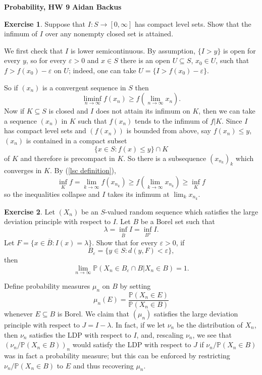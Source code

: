 \documentclass[10pt]{article}
\newcommand{\PP}{\mathbb P}
\theoremstyle{definition}
\newtheorem{exer}{Exercise}
\begin{document}
\noindent
\large\textbf{Probability, HW 9} \hfill \textbf{Aidan Backus} \\



\begin{exer}
Suppose that $I: S \to [0, \infty]$ has compact level sets. Show that the infimum of $I$ over any nonempty closed set is attained.
\end{exer}

We first check that $I$ is lower semicontinuous. By assumption, $\{I > y\}$ is open for every $y$, so for every $\varepsilon > 0$ and $x \in S$ there is an open $U \subseteq S$, $x_0 \in U$, such that $f > f(x_0) - \varepsilon$ on $U$; indeed, one can take $U = \{I > f(x_0) - \varepsilon\}$.

So if $(x_n)$ is a convergent sequence in $S$ then
\begin{equation}
\label{lsc definition}
\liminf_{n \to \infty} f(x_n) \geq f\left(\lim_{n \to \infty} x_n\right).
\end{equation}
Now if $K \subseteq S$ is closed and $I$ does not attain its infimum on $K$, then we can take a sequence $(x_n)$ in $K$ such that $f(x_n)$ tends to the infimum of $f|K$.
Since $I$ has compact level sets and $(f(x_n))$ is bounded from above, say $f(x_n) \leq y$, $(x_n)$ is contained in a compact subset
$$\{x \in S: f(x) \leq y\} \cap K$$
of $K$ and therefore is precompact in $K$.
So there is a subsequence $(x_{n_k})_k$ which converges in $K$.
By (\ref{lsc definition}),
$$\inf_K f = \lim_{k \to \infty} f(x_{n_k}) \geq f\left(\lim_{k \to \infty} x_{n_k}\right) \geq \inf_K f$$
so the inequalities collapse and $I$ takes its infimum at $\lim_k x_{n_k}$.

\begin{exer}
Let $(X_n)$ be an $S$-valued random sequence which satisfies the large deviation principle with respect to $I$.
Let $B$ be a Borel set such that
$$\lambda = \inf_{\overline B} I = \inf_{B^o} I.$$
Let $F = \{x \in \overline B: I(x) = \lambda\}$. Show that for every $\varepsilon > 0$, if
$$B_\varepsilon = \{y \in S: d(y, F) < \varepsilon\},$$
then
$$\lim_{n \to \infty} \PP(X_n \in B_\varepsilon \cap B|X_n \in B) = 1.$$
\end{exer}

Define probability measures $\mu_n$ on $B$ by setting
$$\mu_n(E) = \frac{\PP(X_n \in E)}{\PP(X_n \in B)}$$
whenever $E \subseteq B$ is Borel. We claim that $(\mu_n)$ satisfies the large deviation principle with respect to $J = I - \lambda$.
In fact, if we let $\nu_n$ be the distribution of $X_n$, then $\nu_n$ satisfies the LDP with respect to $I$, and, rescaling $\nu_n$, we see that $(\nu_n/\PP(X_n \in B))_n$ would satisfy the LDP with respect to $J$ if $\nu_n/\PP(X_n \in B)$ was in fact a probability measure; but this can be enforced by restricting $\nu_n/\PP(X_n \in B)$ to $E$ and thus recovering $\mu_n$.
\end{document}
